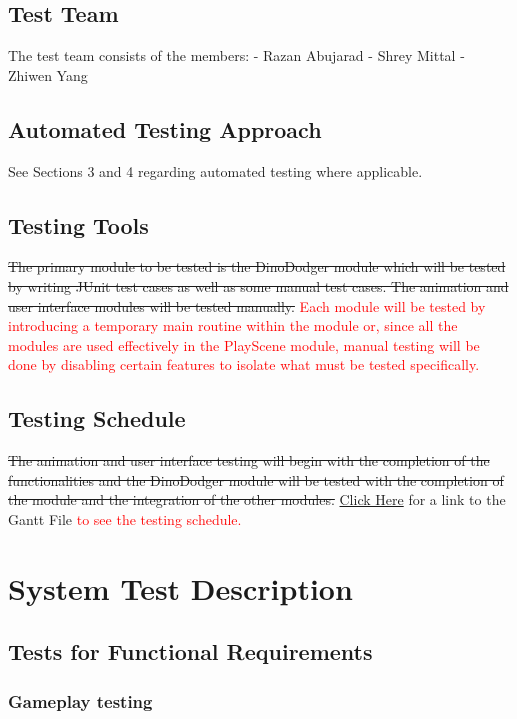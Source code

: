 \documentclass[12pt, titlepage]{article}
\begin{document}
\subsection{Test Team}
The test team consists of the members:
-	Razan Abujarad
-	Shrey Mittal
-	Zhiwen Yang

\subsection{Automated Testing Approach}
See Sections 3 and 4 regarding automated testing where applicable.

\subsection{Testing Tools}
\sout{The primary module to be tested is the DinoDodger module which will be tested by writing JUnit test cases as well as some manual test cases.
The animation and user interface modules will be tested manually.} \textcolor{red}{Each module will be tested by introducing a temporary main routine within the module or, since all the modules are used effectively in the PlayScene module, manual testing will be done by disabling certain features to isolate what must be tested specifically.} 

\subsection{Testing Schedule}
\sout{The animation and user interface testing will begin with the completion of the functionalities and the DinoDodger module will be tested with the completion of the module and the integration of the other modules.}  \href{Gantt_Project_DinoDodger_v2.gan}{Click Here} for a link to the Gantt File \textcolor{red}{to see the testing schedule.}

\section{System Test Description}
	
\subsection{Tests for Functional Requirements}

\subsubsection{Gameplay testing}
		
\end{document}
